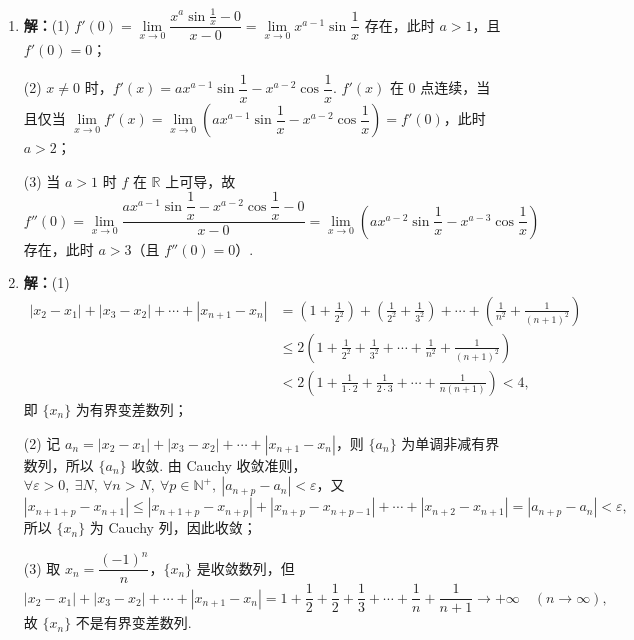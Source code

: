 \documentclass[a4paper,11pt]{ctexart}
\begin{document}
\begin{enumerate}[label=\arabic*., start=16, leftmargin=2em, itemsep=0.9em, topsep=0.4em]
  \item \textbf{解：}(1) $f'(0)=\lim\limits_{x\to 0}\dfrac{x^a\sin\frac{1}{x}-0}{x-0}=\lim\limits_{x\to 0}x^{a-1}\sin\dfrac{1}{x}$ 存在，此时 $a>1$，且 $f'(0)=0$；

  (2) $x\neq 0$ 时，$f'(x)=a x^{a-1}\sin\dfrac{1}{x}-x^{a-2}\cos\dfrac{1}{x}$. $f'(x)$ 在 $0$ 点连续，当且仅当 $\lim\limits_{x\to 0}f'(x)=\lim\limits_{x\to 0}\left(a x^{a-1}\sin\dfrac{1}{x}-x^{a-2}\cos\dfrac{1}{x}\right)=f'(0)$，此时 $a>2$；

  (3) 当 $a>1$ 时 $f$ 在 $\mathbb{R}$ 上可导，故
  \[
    f''(0)=\lim_{x\to 0}\frac{a x^{a-1}\sin\dfrac{1}{x}-x^{a-2}\cos\dfrac{1}{x}-0}{x-0}
    =\lim_{x\to 0}\left(a x^{a-2}\sin\frac{1}{x}-x^{a-3}\cos\frac{1}{x}\right)
  \]
  存在，此时 $a>3$（且 $f''(0)=0$）.

  \item \textbf{解：}(1)
  \begin{align*}
    |x_2-x_1|+|x_3-x_2|+\cdots+|x_{n+1}-x_n|
    &= \left(1+\frac{1}{2^2}\right)+\left(\frac{1}{2^2}+\frac{1}{3^2}\right)+\cdots+\left(\frac{1}{n^2}+\frac{1}{(n+1)^2}\right) \\
    &\le 2\left(1+\frac{1}{2^2}+\frac{1}{3^2}+\cdots+\frac{1}{n^2}+\frac{1}{(n+1)^2}\right) \\
    &< 2\left(1+\frac{1}{1\cdot 2}+\frac{1}{2\cdot 3}+\cdots+\frac{1}{n(n+1)}\right) < 4,
  \end{align*}
  即 $\{x_n\}$ 为有界变差数列；

  (2) 记 $a_n=|x_2-x_1|+|x_3-x_2|+\cdots+|x_{n+1}-x_n|$，则 $\{a_n\}$ 为单调非减有界数列，所以 $\{a_n\}$ 收敛. 由 Cauchy 收敛准则，$\forall\varepsilon>0,\ \exists N,\ \forall n>N,\ \forall p\in\mathbb{N}^+,\ |a_{n+p}-a_n|<\varepsilon$，又
  \[
    |x_{n+1+p}-x_{n+1}|\le |x_{n+1+p}-x_{n+p}|+|x_{n+p}-x_{n+p-1}|+\cdots+|x_{n+2}-x_{n+1}|=|a_{n+p}-a_n|<\varepsilon,
  \]
  所以 $\{x_n\}$ 为 Cauchy 列，因此收敛；

  (3) 取 $x_n=\dfrac{(-1)^n}{n}$，$\{x_n\}$ 是收敛数列，但
  \[
    |x_2-x_1|+|x_3-x_2|+\cdots+|x_{n+1}-x_n|
    =1+\frac{1}{2}+\frac{1}{2}+\frac{1}{3}+\cdots+\frac{1}{n}+\frac{1}{n+1}\to+\infty\quad (n\to\infty),
  \]
  故 $\{x_n\}$ 不是有界变差数列.
\end{enumerate}
\end{document}

